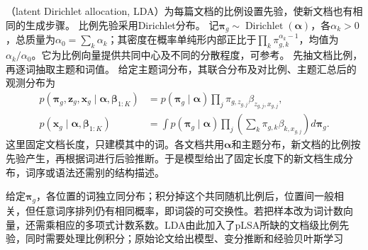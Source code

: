 （latent Dirichlet allocation, LDA）为每篇文档的比例设置先验，使新文档也有相同的生成步骤。
比例先验采用Dirichlet分布。
记$\bm\pi_g\sim\operatorname{Dirichlet}(\bm\alpha)$，各$\alpha_k>0$，总质量为$\alpha_0=\sum_k\alpha_k$；其密度在概率单纯形内部正比于$\prod_k\pi_{g,k}^{\alpha_k-1}$，均值为$\alpha_k/\alpha_0$。它为比例向量提供共同中心及不同的分散程度，可参考。
先抽文档比例，再逐词抽取主题和词值。
给定主题词分布，其联合分布及对比例、主题汇总后的观测分布为
\begin{equation}
  \label{eq:pgm-static-directed-lda}
  \begin{aligned}
    p(\bm{\pi}_g,\bm{z}_g,\bm{x}_g\mid
          \bm{\alpha},\bm{\beta}_{1:K})
      &=p(\bm{\pi}_g\mid\bm{\alpha})
         \prod_j\pi_{g,z_{g,j}}\beta_{z_{g,j},x_{g,j}},\\
    p(\bm{x}_g\mid\bm{\alpha},\bm{\beta}_{1:K})
      &=\int p(\bm{\pi}_g\mid\bm{\alpha})
          \prod_j\left(\sum_k
              \pi_{g,k}\beta_{k,x_{g,j}}\right)d\bm{\pi}_g.
  \end{aligned}
\end{equation}
这里固定文档长度，只建模其中的词。各文档共用$\bm\alpha$和主题分布，新文档的比例按先验产生，再根据词进行后验推断。于是模型给出了固定长度下的新文档生成分布，词序或语法还需别的结构描述。

给定$\bm\pi_g$，各位置的词独立同分布；积分掉这个共同随机比例后，位置间一般相关，但任意词序排列仍有相同概率，即词袋的可交换性。若把样本改为词计数向量，还需乘相应的多项式计数系数。LDA由此加入了pLSA所缺的文档级比例先验，同时需要处理比例积分；原始论文给出模型、变分推断和经验贝叶斯学习

